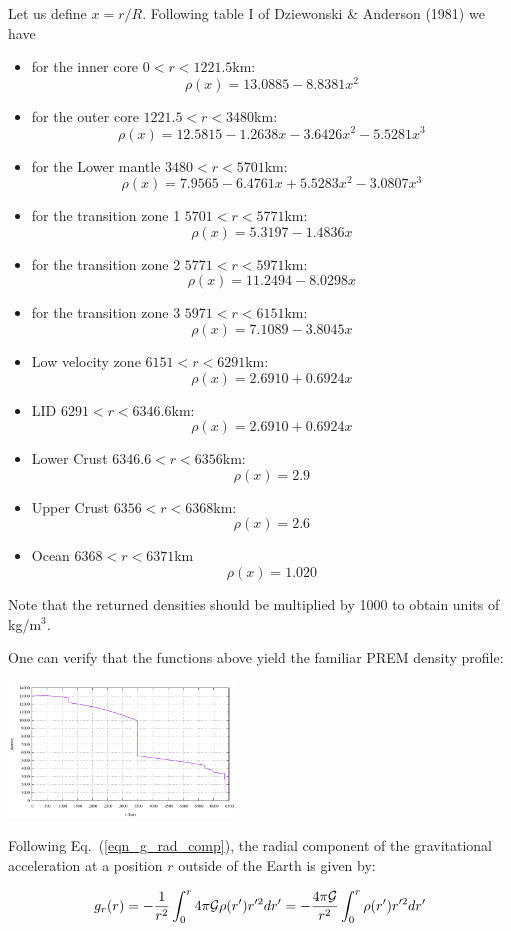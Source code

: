 

Let us define $x=r/R$.
Following table I of Dziewonski \& Anderson (1981) \cite{dzan81}
we have 

\begin{itemize}
\item for the inner core $0<r<1221.5$km:
\[
\rho(x) =13.0885-8.8381 x^2
\]
\item for the outer core $1221.5<r<3480$km:
\[
\rho(x)=12.5815-1.2638x-3.6426x^2-5.5281x^3
\]
\item for the Lower mantle $3480<r<5701$km:
\[
\rho(x)=7.9565-6.4761x+5.5283x^2-3.0807x^3
\]
\item for the transition zone 1 $5701<r<5771$km:
\[
\rho(x)=5.3197-1.4836x
\]
\item for the transition zone 2 $5771<r<5971$km:
\[
\rho(x)=11.2494-8.0298x
\]
\item for the transition zone 3 $5971<r<6151$km:
\[
\rho(x)=7.1089-3.8045x
\]
\item Low velocity zone $6151<r<6291$km:
\[
\rho(x)=2.6910+0.6924x
\]
\item LID  $6291<r<6346.6$km:
\[
\rho(x)=2.6910+0.6924x
\]
\item Lower Crust $6346.6<r<6356$km:
\[
\rho(x)=2.9
\]
\item Upper Crust $6356<r<6368$km:
\[
\rho(x)=2.6
\]
\item Ocean $6368<r<6371$km
\[
\rho(x)=1.020
\]
\end{itemize}

\noindent Note that the returned densities should be multiplied by 1000 to obtain 
units of kg/m$^3$.

One can verify that the functions above yield the familiar PREM density profile:
\begin{center}
\includegraphics[width=6cm]{images/prem/rho.pdf}
\end{center}

Following Eq.~(\ref{eqn_g_rad_comp}), the radial component of the gravitational 
acceleration at a position $r$ outside of the Earth is given by:

\begin{equation}
g_r(r) 
= - \frac{1}{r^2} \int_0^r 4\pi {\cal G} \rho(r') r'^2 dr'
= - \frac{4 \pi {\cal G}}{r^2} \int_0^r \rho(r') r'^2 dr'
\end{equation}
 

